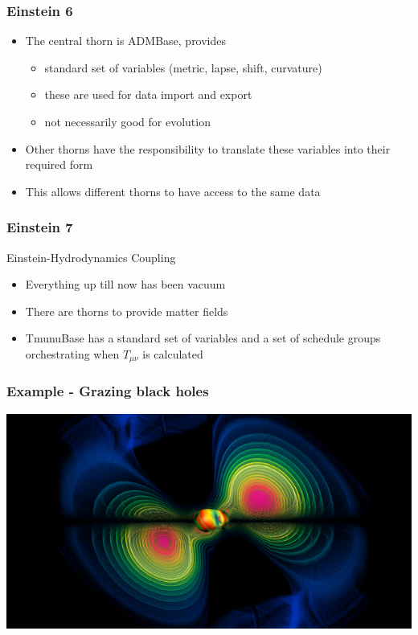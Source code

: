 \documentclass{beamer}
\begin{document}
\begin{frame}
  \frametitle{Einstein 6}
  \begin{itemize}
    \item The central thorn is ADMBase, provides
    \begin{itemize}
      \item standard set of variables (metric, lapse, shift, curvature)
      \item these are used for data import and export
      \item not necessarily good for evolution
    \end{itemize}
    \item Other thorns have the responsibility to translate these variables into their required form
    \item This allows different thorns to have access to the same data
  \end{itemize}
\end{frame}

\begin{frame}
  \frametitle{Einstein 7}
  Einstein-Hydrodynamics Coupling
  \begin{itemize}
    \item Everything up till now has been vacuum
    \item There are thorns to provide matter fields
    \item TmunuBase has a standard set of variables and a set of schedule groups orchestrating when $T_{\mu\nu}$ is calculated
  \end{itemize}
\end{frame}

\begin{frame}
  \frametitle{Example - Grazing black holes}
  \includegraphics[scale=0.5]{image1.jpg}
\end{frame}
\end{document}
